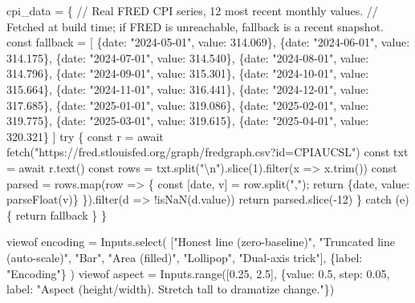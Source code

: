 \documentclass[
  letterpaper,
  11pt,
  twoside,
  openany]{scrbook}
\newenvironment{Shaded}{\begin{snugshade}}{\end{snugshade}}
\newcommand{\NormalTok}[1]{\textcolor[rgb]{0.33,0.33,0.33}{#1}}
\begin{document}
\begin{Shaded}
\begin{Highlighting}[]
\NormalTok{cpi\_data = \{}
\NormalTok{  // Real FRED CPI series, 12 most recent monthly values.}
\NormalTok{  // Fetched at build time; if FRED is unreachable, fallback is a recent snapshot.}
\NormalTok{  const fallback = [}
\NormalTok{    \{date: "2024{-}05{-}01", value: 314.069\},}
\NormalTok{    \{date: "2024{-}06{-}01", value: 314.175\},}
\NormalTok{    \{date: "2024{-}07{-}01", value: 314.540\},}
\NormalTok{    \{date: "2024{-}08{-}01", value: 314.796\},}
\NormalTok{    \{date: "2024{-}09{-}01", value: 315.301\},}
\NormalTok{    \{date: "2024{-}10{-}01", value: 315.664\},}
\NormalTok{    \{date: "2024{-}11{-}01", value: 316.441\},}
\NormalTok{    \{date: "2024{-}12{-}01", value: 317.685\},}
\NormalTok{    \{date: "2025{-}01{-}01", value: 319.086\},}
\NormalTok{    \{date: "2025{-}02{-}01", value: 319.775\},}
\NormalTok{    \{date: "2025{-}03{-}01", value: 319.615\},}
\NormalTok{    \{date: "2025{-}04{-}01", value: 320.321\}}
\NormalTok{  ]}
\NormalTok{  try \{}
\NormalTok{    const r = await fetch("https://fred.stlouisfed.org/graph/fredgraph.csv?id=CPIAUCSL")}
\NormalTok{    const txt = await r.text()}
\NormalTok{    const rows = txt.split("\textbackslash{}n").slice(1).filter(x =\textgreater{} x.trim())}
\NormalTok{    const parsed = rows.map(row =\textgreater{} \{ const [date, v] = row.split(","); return \{date, value: parseFloat(v)\} \}).filter(d =\textgreater{} !isNaN(d.value))}
\NormalTok{    return parsed.slice({-}12)}
\NormalTok{  \} catch (e) \{}
\NormalTok{    return fallback}
\NormalTok{  \}}
\NormalTok{\}}
\end{Highlighting}
\end{Shaded}

\begin{Shaded}
\begin{Highlighting}[]
\NormalTok{viewof encoding = Inputs.select(}
\NormalTok{  ["Honest line (zero{-}baseline)", "Truncated line (auto{-}scale)", "Bar", "Area (filled)", "Lollipop", "Dual{-}axis trick"],}
\NormalTok{  \{label: "Encoding"\}}
\NormalTok{)}
\NormalTok{viewof aspect = Inputs.range([0.25, 2.5], \{value: 0.5, step: 0.05, label: "Aspect (height/width). Stretch tall to dramatize change."\})}
\end{Highlighting}
\end{Shaded}
\end{document}
